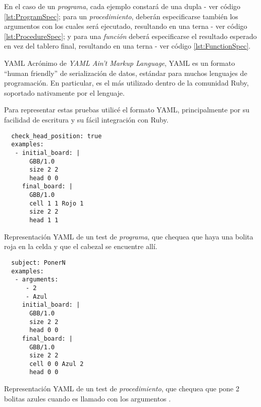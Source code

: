 En el caso de un \emph{programa}, cada ejemplo constará de una dupla  - ver código \ref{lst:ProgramSpec}; para un \emph{procedimiento}, deberán especificarse también los argumentos con los cuales será ejecutado, resultando en una terna  - ver código \ref{lst:ProcedureSpec}; y para una \emph{función} deberá especificarse el resultado esperado en vez del tablero final, resultando en una terna  - ver código \ref{lst:FunctionSpec}.

\sepfootnotecontent
  {YAML}
  {Acrónimo de \emph{YAML Ain't Markup Language}, YAML es un formato ``human friendly'' de serialización de datos, estándar para muchos lenguajes de programación. En particular, es el más utilizado dentro de la comunidad Ruby, soportado nativamente por el lenguaje.}

Para representar estas pruebas utilicé el formato YAML, principalmente por su facilidad de escritura y su fácil integración con Ruby.

\begin{listing}
  \centering

  \begin{verbatim}
  check_head_position: true
  examples:
   - initial_board: |
       GBB/1.0
       size 2 2
       head 0 0
     final_board: |
       GBB/1.0
       cell 1 1 Rojo 1
       size 2 2
       head 1 1
  \end{verbatim}

  \caption{Representación YAML de un test de \emph{programa}, que chequea que haya una bolita roja en la celda  y que el cabezal se encuentre allí.}
  \label{lst:ProgramSpec}
\end{listing}

\begin{listing}
  \centering

  \begin{verbatim}
  subject: PonerN
  examples:
   - arguments:
      - 2
      - Azul
     initial_board: |
       GBB/1.0
       size 2 2
       head 0 0
     final_board: |
       GBB/1.0
       size 2 2
       cell 0 0 Azul 2
       head 0 0
  \end{verbatim}

  \caption{Representación YAML de un test de \emph{procedimiento}, que chequea que  pone 2 bolitas azules cuando es llamado con los argumentos .}
  \label{lst:ProcedureSpec}
\end{listing}

